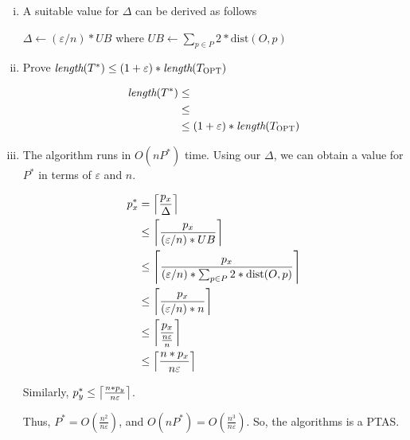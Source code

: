 \begin{enumerate}[(i)]
	\item A suitable value for $\Delta$ can be derived as follows

\begin{sourcecode}
$\Delta \leftarrow (\varepsilon / n) * UB$ where $UB \leftarrow \sum_{p \in P}{2 * \text{dist}(O, p)}$ 
\end{sourcecode}

	\item Prove $\textit{length}(T^*) \leq (1 + \varepsilon) * \textit{length}(T_{\textsc{OPT}})$

\begin{equation}
\begin{split}
\textit{length}(T^*)  &\leq \\
&\leq \\
&\leq (1 + \varepsilon) * \textit{length}(T_{\textsc{OPT}})
\end{split}
\end{equation}

	\item The algorithm runs in $O(nP^*)$ time.
		Using our $\Delta$, we can obtain a value for $P^*$ in terms of $\varepsilon$ and $n$.

		\begin{align}
			p^*_x &= \ceil*{\frac{p_x}{\Delta}}\\
			      &\leq \ceil*{\frac{p_x}{(\varepsilon / n) * UB}}\\
				  &\leq \ceil*{\frac{p_x}{(\varepsilon / n) * \sum_{p \in P}{2 * \text{dist}(O, p)}}}\\
			      &\leq \ceil*{\frac{p_x}{(\varepsilon / n) * n}}\\
				  &\leq \ceil*{\frac{p_x}{\frac{n\varepsilon}{n}}}\\
				  &\leq \ceil*{\frac{n * p_x}{n\varepsilon}}
		\end{align}

		Similarly, $p^*_y \leq \ceil*{\frac{n * p_y}{n\varepsilon}}$.

		Thus, $P^* = O\left(\frac{n^2}{n\varepsilon}\right)$, and $O(nP^*) = O\left(\frac{n^3}{n\varepsilon}\right)$.
		So, the algorithms is a PTAS.
\end{enumerate}
